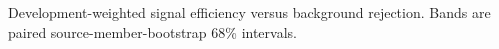 Development-weighted signal efficiency versus background rejection. Bands are paired source-member-bootstrap 68\% intervals.
